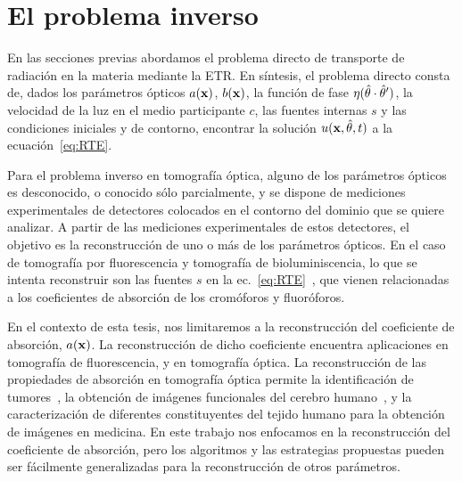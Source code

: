 \pagestyle{fancy}
\chapter{El problema inverso}
\lhead{\thepage}
\vspace{0.01\textheight}
\label{sec:inverso}
\pagebreak

En las secciones previas abordamos el problema directo de transporte 
de radiación en la materia mediante la ETR. En síntesis, el problema 
directo consta de, dados los parámetros ópticos $a(\mathbf{x})$, $b(\mathbf{x})$, la función  
de fase $\eta(\hat{\theta}\cdot \hat{\theta}')$, la velocidad de la luz en el medio participante 
$c$, las fuentes internas $s$ y las condiciones iniciales y de contorno, 
encontrar la solución $u(\mathbf{x},\hat{\theta},t)$ a la ecuación~\eqref{eq:RTE}.

Para el problema inverso en tomografía óptica, alguno de los parámetros 
ópticos es desconocido, 
o conocido sólo parcialmente, y se dispone de mediciones experimentales 
de detectores colocados en el contorno del dominio que se quiere analizar. 
A partir de las mediciones experimentales de estos detectores, 
el objetivo es la reconstrucción de uno o más de los parámetros ópticos. 
En el caso de tomografía por fluorescencia y tomografía de bioluminiscencia, lo que se intenta reconstruir 
son las fuentes $s$ en la ec.~\eqref{eq:RTE}~\cite{Klose2005,Klose2009,Ren2010}, 
que vienen relacionadas a los coeficientes de absorción de los 
cromóforos y fluoróforos. 

En el contexto de esta tesis, nos limitaremos a la reconstrucción del 
coeficiente de absorción, $a(\mathbf{x})$. La reconstrucción de dicho coeficiente 
encuentra aplicaciones en tomografía de fluorescencia, y en tomografía óptica. 
La reconstrucción de las propiedades de absorción en tomografía óptica 
 permite la identificación de tumores~\cite{Zhu2005,Zhu2010,Fujii2016b}, 
la obtención de imágenes funcionales del cerebro humano~\cite{Boas2001,bluestone2001,Arridge1999}, 
y la caracterización de diferentes constituyentes del tejido 
humano para la obtención de imágenes en medicina. En 
este trabajo nos enfocamos en la reconstrucción del coeficiente 
de absorción, pero los algoritmos y las estrategias propuestas 
pueden ser fácilmente generalizadas para la reconstrucción 
de otros parámetros. 

